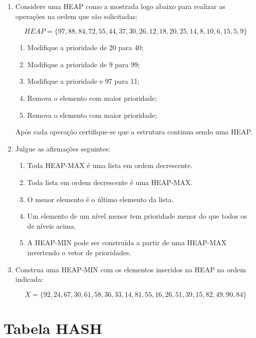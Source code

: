 \documentclass[12pt]{article}
\begin{document}
\begin{enumerate}[resume,label=\textbf{Q\arabic*}]
    \item Considere uma HEAP como a mostrada logo abaixo para realizar as operações na ordem que são solicitadas:

          $$HEAP = \{97, 88, 84, 72, 55, 44, 37, 30, 26, 12, 18, 20, 25, 14, 8, 10, 6, 15, 5, 9\}$$
          \begin{enumerate}
              \item Modifique a prioridade de 20 para 40;
              \item Modifique a prioridade de 9 para 99;
              \item Modifique a prioridade e 97 para 11;
              \item Remova o elemento com maior prioridade;
              \item Remova o elemento com maior prioridade;
          \end{enumerate}

          Após cada operação certifique-se que a estrutura continua sendo uma HEAP.

    \item Julgue as afirmações seguintes:

          \begin{enumerate}
              \item Toda HEAP-MAX é uma lista em ordem decrescente.
              \item Toda lista em ordem decrescente é uma HEAP-MAX.
              \item O menor elemento é o último elemento da lista.
              \item Um elemento de um nível menor tem prioridade menor do que todos os de níveis acima.
              \item A HEAP-MIN pode ser construída a partir de uma HEAP-MAX invertendo o vetor de prioridades.
          \end{enumerate}

    \item Construa uma HEAP-MIN com os elementos inseridos na HEAP na ordem indicada:

          $$X = \{92,24,67,30,61,58,36,33,14,81,55,16,26,51,39,15,82,49,90,84\}$$

\end{enumerate}

\section{Tabela HASH}
\end{document}
